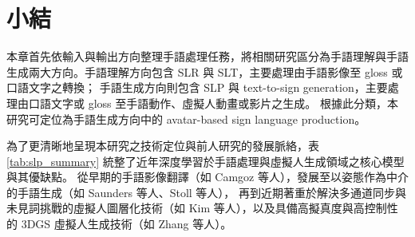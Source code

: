 \documentclass[class=NCU_thesis, crop=false]{standalone}
\begin{document}
\section{小結}
\label{sec:related_work_summary}

本章首先依輸入與輸出方向整理手語處理任務，將相關研究區分為手語理解與手語生成兩大方向。手語理解方向包含 SLR 與 SLT，主要處理由手語影像至 gloss 或口語文字之轉換；
手語生成方向則包含 SLP 與 text-to-sign generation，主要處理由口語文字或 gloss 至手語動作、虛擬人動畫或影片之生成。
根據此分類，本研究可定位為手語生成方向中的 avatar-based sign language production。

為了更清晰地呈現本研究之技術定位與前人研究的發展脈絡，表 \ref{tab:slp_summary} 統整了近年深度學習於手語處理與虛擬人生成領域之核心模型與其優缺點。
從早期的手語影像翻譯（如 Camgoz 等人），發展至以姿態作為中介的手語生成（如 Saunders 等人、Stoll 等人），
再到近期著重於解決多通道同步與未見詞挑戰的虛擬人圖層化技術（如 Kim 等人），以及具備高擬真度與高控制性的 3DGS 虛擬人生成技術（如 Zhang 等人）。
\end{document}
